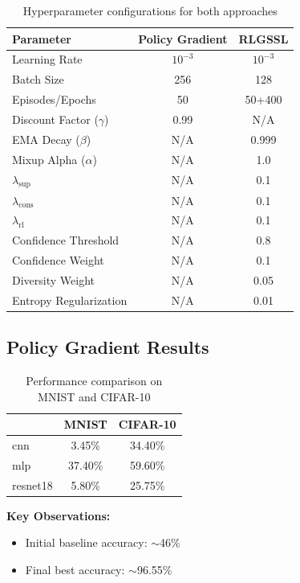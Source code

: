 \documentclass{scrartcl}
\begin{document}
\begin{table}[H]
    \centering
    \begin{tabular}{lcc}
        \hline
        \textbf{Parameter} & \textbf{Policy Gradient} & \textbf{RLGSSL} \\
        \hline
        Learning Rate & $10^{-3}$ & $10^{-3}$ \\
        Batch Size & 256 & 128 \\
        Episodes/Epochs & 50 & 50+400 \\
        Discount Factor ($\gamma$) & 0.99 & N/A \\
        EMA Decay ($\beta$) & N/A & 0.999 \\
        Mixup Alpha ($\alpha$) & N/A & 1.0 \\
        $\lambda_{\text{sup}}$ & N/A & 0.1 \\
        $\lambda_{\text{cons}}$ & N/A & 0.1 \\
        $\lambda_{\text{rl}}$ & N/A & 0.1 \\
        Confidence Threshold & N/A & 0.8 \\
        Confidence Weight & N/A & 0.1 \\
        Diversity Weight & N/A & 0.05 \\
        Entropy Regularization & N/A & 0.01 \\
        \hline
    \end{tabular}
    \caption{Hyperparameter configurations for both approaches}
    \label{tab:hyperparameters}
\end{table}

\subsection{Policy Gradient Results}
\begin{table}[h]
\centering
\begin{tabular}{lcc}
\hline
\textbf{} & \textbf{MNIST} & \textbf{CIFAR-10} \\
\hline
cnn      & 3.45\%  & 34.40\% \\
mlp      & 37.40\% & 59.60\% \\
resnet18 & 5.80\%  & 25.75\% \\
\hline
\end{tabular}
\caption{Performance comparison on MNIST and CIFAR-10}
\end{table}

\textbf{Key Observations:}
\begin{itemize}
    \item Initial baseline accuracy: $\sim$46\%
    \item Final best accuracy: $\sim$96.55\%
\end{itemize}
\end{document}
